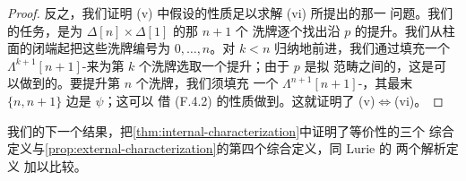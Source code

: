 \begin{proof}
反之，我们证明 (v) 中假设的\trLifting{}性质足以求解 (vi) 所提出的那一%
\trLifting{}问题。我们的任务，是为 $\Delta[n]\times\Delta[1]$ 的那 $n+1$ 个
洗牌逐个找出沿 $p$ 的提升。我们从柱面的闭端起把这些洗牌编号为
$0,\dotsc,n$。对 $k<n$ 归纳地前进，我们通过填充一个
$\Lambda^{k+1}[n+1]$-\trHorn{}来为第 $k$ 个洗牌选取一个提升；由于 $p$ 是拟
范畴之间的\trIsofibration，这是可以做到的。要提升第 $n$ 个洗牌，我们须填充
一个 $\Lambda^{n+1}[n+1]$-\trHorn{}，其最末 $\{n,n+1\}$ 边是 $\psi$；这可以
借 (F.4.2) 的\trLifting{}性质做到。这就证明了 (v)$\Longleftrightarrow$(vi)。
\end{proof}

我们的下一个结果，把\cref{thm:internal-characterization}中证明了等价性的三个
综合定义与\cref{prop:external-characterization}的第四个综合定义，同 Lurie 的
两个解析定义 \cite[\S 2.4.1--2]{bib78} 加以比较。

